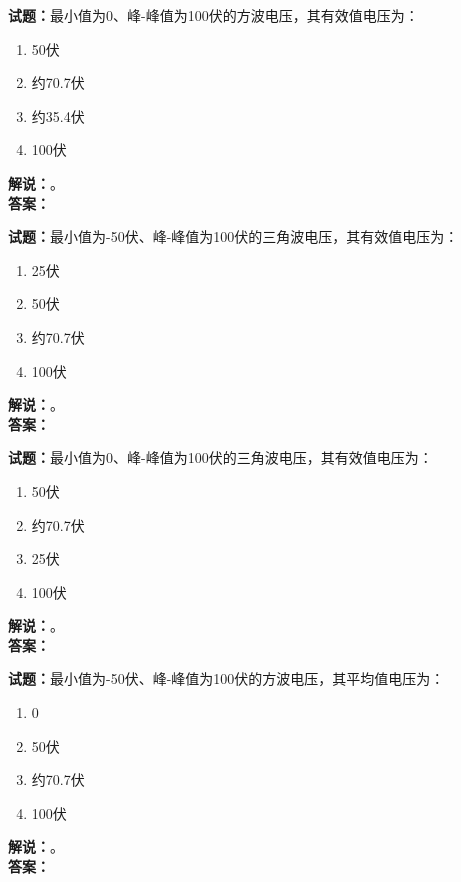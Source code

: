 \documentclass{ctexbook}
\begin{document}
\vspace{\baselineskip}

\noindent\textbf{试题：}最小值为0、峰-峰值为100伏的方波电压，其有效值电压为：
\begin{enumerate}[leftmargin=3em]
  \item 50伏
  \item 约70.7伏
  \item 约35.4伏
  \item 100伏
\end{enumerate}
\noindent\textbf{解说：}\textbf{}。\\\noindent\textbf{答案：}

\vspace{\baselineskip}

\noindent\textbf{试题：}最小值为-50伏、峰-峰值为100伏的三角波电压，其有效值电压为：
\begin{enumerate}[leftmargin=3em]
  \item 25伏
  \item 50伏
  \item 约70.7伏
  \item 100伏
\end{enumerate}
\noindent\textbf{解说：}\textbf{}。\\\noindent\textbf{答案：}

\vspace{\baselineskip}

\noindent\textbf{试题：}最小值为0、峰-峰值为100伏的三角波电压，其有效值电压为：
\begin{enumerate}[leftmargin=3em]
  \item 50伏
  \item 约70.7伏
  \item 25伏
  \item 100伏
\end{enumerate}
\noindent\textbf{解说：}\textbf{}。\\\noindent\textbf{答案：}

\vspace{\baselineskip}

\noindent\textbf{试题：}最小值为-50伏、峰-峰值为100伏的方波电压，其平均值电压为：
\begin{enumerate}[leftmargin=3em]
  \item 0
  \item 50伏
  \item 约70.7伏
  \item 100伏
\end{enumerate}
\noindent\textbf{解说：}\textbf{}。\\\noindent\textbf{答案：}
\end{document}
